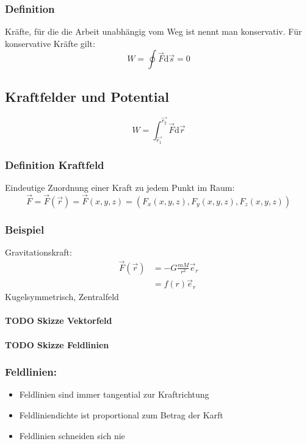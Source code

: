 \documentclass[a4paper]{scrartcl}
\renewcommand{\d}{\mathrm{d}}
\renewcommand{\v}[1]{\vec{#1}}
\theoremstyle{definition}
\theoremstyle{plain}
\theoremstyle{plain}
\theoremstyle{remark}
\theoremstyle{remark}
\theoremstyle{remark}
\begin{document}
\subsubsection{Definition}
\label{sec-4-8-1}
Kräfte, für die die Arbeit unabhängig vom Weg ist nennt man konservativ.
Für konservative Kräfte gilt:
\[W=\oint \v F\d \v s = 0\]
\subsection{Kraftfelder und Potential}
\label{sec-4-9}
\[W = \int_{\v{r_1}}^{\v{r_2}}\v F\d \v r\]
\subsubsection{Definition Kraftfeld}
\label{sec-4-9-1}
Eindeutige Zuordnung einer Kraft zu jedem Punkt im Raum:
\[\v F = \v F(\v r) = \v F(x,y,z) = (F_x(x,y,z),F_y(x,y,z),F_z(x,y,z))\]
\subsubsection{Beispiel}
\label{sec-4-9-2}
Gravitationskraft:
\begin{align}
\v F(\v r) &= -G\frac{m M}{r^2}\v e_r \\
&= f(r) \v e_r
\end{align}
Kugelsymmetrisch, Zentralfeld
\paragraph{{\bfseries\sffamily TODO} Skizze Vektorfeld}
\label{sec-4-9-2-1}
\paragraph{{\bfseries\sffamily TODO} Skizze Feldlinien}
\label{sec-4-9-2-2}
\subsubsection{Feldlinien:}
\label{sec-4-9-3}
\begin{itemize}
\item Feldlinien sind immer tangential zur Kraftrichtung
\item Feldliniendichte ist proportional zum Betrag der Karft
\item Feldlinien schneiden sich nie
\end{itemize}
\end{document}

